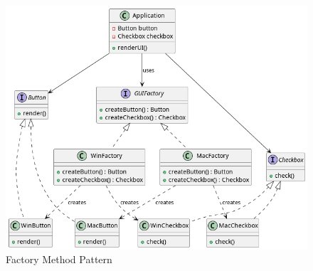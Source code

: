 \begin{figure}[h]
	\centering
	\includegraphics[width=.9\textwidth]{../figures/out/factory_abstract.png}
	\caption{Factory Method Pattern}
	\label{fig:factory-abstract}
\end{figure}

